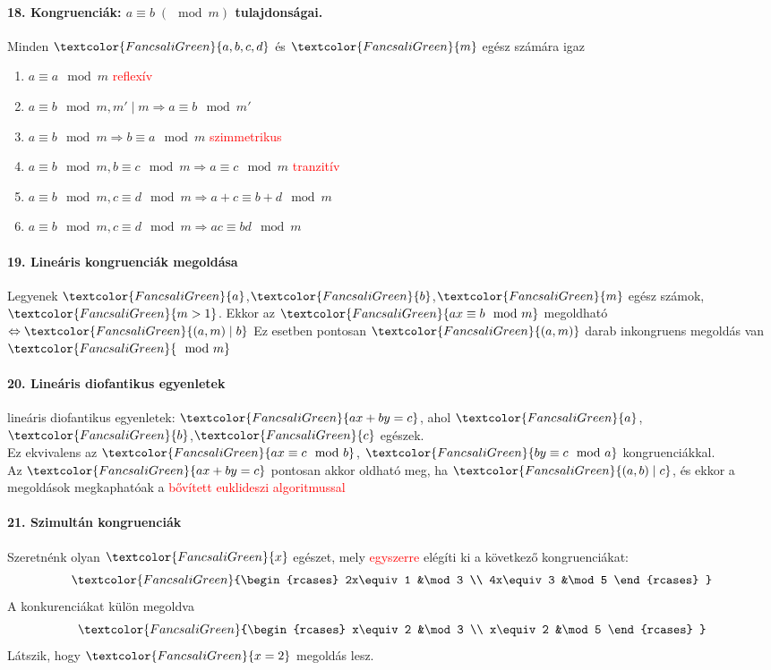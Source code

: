 \documentclass[10pt,a4paper]{article}
\renewcommand{\>}{\rightarrow}
\renewcommand{\a}{\gr{a}}
\renewcommand{\b}{\gr{b}}
\renewcommand{\c}{\gr{c}}
\newcommand{\x}{\gr{x}}
\newcommand{\red}[1]{\textcolor{red}{#1}}
\newcommand{\gr}[1]{\textcolor{FancsaliGreen}{#1}}
\newenvironment{m}
    {\begin{center}
    \begin{mdframed}[backgroundcolor=FancsaliBlue]
    }
    { 
    \end{mdframed}
    \end{center}
    }
\begin{document}
\paragraph{18. Kongruenciák: $a \equiv b \;(\mod m)$ tulajdonságai.}
\begin{m}
Minden $\gr{a,b,c,d}$ és $\gr{m}$ egész számára igaz
\begin{enumerate}
\item $a \equiv a \mod m$ \red{reflexív}
\item $a \equiv b \mod m, m' \mid m \Rightarrow a \equiv b \mod m'$
\item $a \equiv b \mod m  \Rightarrow b \equiv a \mod m $ \red{szimmetrikus} 
\item $a \equiv b \mod m, b\equiv c \mod m \Rightarrow a \equiv c   \mod m $ \red{tranzitív}
\item $a \equiv b \mod m, c \equiv d \mod m \Rightarrow a + c \equiv b+ d \mod m$
\item $a \equiv b \mod m ,c \equiv d \mod m \Rightarrow ac\equiv bd \mod m$
\end{enumerate}
\end{m}
\paragraph{19. Lineáris kongruenciák megoldása}
\begin{m}
Legyenek $\a$,$\b$,$\gr{m}$ egész számok, $\gr{m>1}$. Ekkor az $\gr{ax \equiv b \mod m}$ megoldható $\Leftrightarrow \gr{(a,m)\mid b}$ Ez esetben pontosan $\gr{(a,m)}$ darab inkongruens megoldás van $\gr{\mod m}$
\end{m}
\paragraph{20. Lineáris diofantikus egyenletek}
\begin{m}
lineáris diofantikus egyenletek: $\gr{ax+by=c}$, ahol $\a$,$\b$,$\c$ egészek. \\
Ez ekvivalens az $\gr{ax \equiv c \mod b}$, $\gr{by\equiv c \mod a}$ kongruenciákkal. \\
Az $\gr{ax+by = c}$ pontosan akkor oldható meg, ha $\gr{(a,b)\mid c}$, és ekkor a megoldások megkaphatóak a \red{bővített euklideszi algoritmussal} 
\end{m}
\paragraph{21. Szimultán kongruenciák}
\begin{m}
Szeretnénk olyan $\x$ egészet, mely \red{egyszerre} elégíti ki a következő kongruenciákat:
\[\gr
{\begin{rcases}
2x\equiv 1 &\mod 3 \\
4x\equiv 3 &\mod 5
\end{rcases} 
}\]
A konkurenciákat külön megoldva	
\[\gr
{\begin{rcases}
x\equiv 2 &\mod 3 \\
x\equiv 2 &\mod 5
\end{rcases} 
}\]
Látszik, hogy $\gr{x=2}$ megoldás lesz. 
\end{m}
\end{document}

